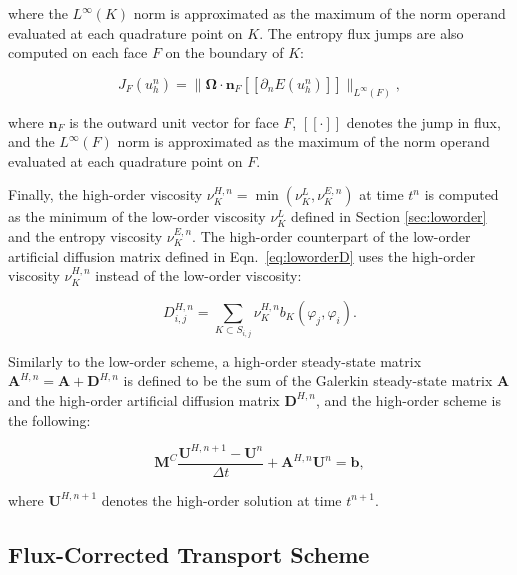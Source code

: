 \noindent
where the $L^\infty(K)$ norm is approximated as the maximum of the norm operand evaluated
at each quadrature point on $K$.
The entropy flux jumps are also computed on each face $F$ on the boundary of $K$:

\begin{equation}
   J_F(u_h^n) = \|\mathbf{\Omega}\cdot
      \mathbf{n}_F[\![\partial_n E(u_h^n)]\!]\|_{L^\infty(F)},
\end{equation}

\noindent
where $\mathbf{n}_F$ is the outward unit vector for face $F$,
$[\![\cdot]\!]$ denotes the jump in flux, and
the $L^\infty(F)$ norm is approximated as the maximum of the norm operand evaluated
at each quadrature point on $F$.

Finally, the high-order viscosity $\nu^{H,n}_K = \min(\nu^{L}_K,\nu^{E,n}_K)$ at
time $t^n$ is computed as the minimum
of the low-order viscosity $\nu^{L}_K$ defined in Section \ref{sec:loworder} and
the entropy viscosity $\nu^{E,n}_K$. The high-order counterpart of the low-order
artificial diffusion matrix defined in Eqn.~\ref{eq:loworderD} uses the high-order viscosity
$\nu_K^{H,n}$ instead of the low-order viscosity:

\begin{equation}
   D^{H,n}_{i,j} = \sum\limits_{K\subset S_{i,j}}\nu_K^{H,n} b_K(\varphi_j,\varphi_i).
\end{equation}

\noindent
Similarly to the low-order scheme, a high-order steady-state matrix
$\mathbf{A}^{H,n} = \mathbf{A} + \mathbf{D}^{H,n}$ is
defined to be the sum of the Galerkin steady-state matrix $\mathbf{A}$ and the
high-order artificial diffusion matrix $\mathbf{D}^{H,n}$,
and the high-order scheme is the following:

\begin{equation}\label{eq:highorderscheme}
   \mathbf{M}^C\frac{\mathbf{U}^{H,n+1}-\mathbf{U}^n}{\Delta t}
      +\mathbf{A}^{H,n}\mathbf{U}^n = \mathbf{b},
\end{equation}

\noindent
where $\mathbf{U}^{H,n+1}$ denotes the high-order solution at time $t^{n+1}$.

\subsection{Flux-Corrected Transport Scheme}\label{sec:fct}

